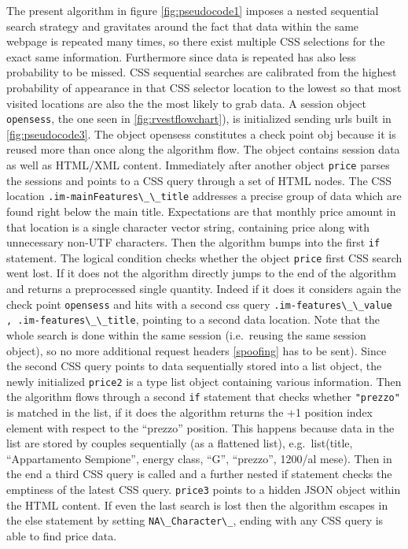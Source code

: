 \documentclass[
  12pt,
  a4paper,
  oneside]{book}
\newcommand{\passthrough}[1]{#1}
\theoremstyle{definition}
\theoremstyle{definition}
\theoremstyle{definition}
\theoremstyle{remark}
\begin{document}
The present algorithm in figure \ref{fig:pseudocode1} imposes a nested sequential search strategy and gravitates around the fact that data within the same webpage is repeated many times, so there exist multiple CSS selections for the exact same information. Furthermore since data is repeated has also less probability to be missed. CSS sequential searches are calibrated from the highest probability of appearance in that CSS selector location to the lowest so that most visited locations are also the the most likely to grab data.
A session object \passthrough{\lstinline!opensess!}, the one seen in \ref{fig:rvestflowchart}), is initialized sending urls built in \ref{fig:pseudocode3}. The object opensess constitutes a check point obj because it is reused more than once along the algorithm flow. The object contains session data as well as HTML/XML content. Immediately after another object \passthrough{\lstinline!price!} parses the sessions and points to a CSS query through a set of HTML nodes. The CSS location \passthrough{\lstinline!.im-mainFeatures\_\_title!} addresses a precise group of data which are found right below the main title. Expectations are that monthly price amount in that location is a single character vector string, containing price along with unnecessary non-UTF characters. Then the algorithm bumps into the first \passthrough{\lstinline!if!} statement. The logical condition checks whether the object \passthrough{\lstinline!price!} first CSS search went lost. If it does not the algorithm directly jumps to the end of the algorithm and returns a preprocessed single quantity. Indeed if it does it considers again the check point \passthrough{\lstinline!opensess!} and hits with a second css query \passthrough{\lstinline!.im-features\_\_value , .im-features\_\_title!}, pointing to a second data location. Note that the whole search is done within the same session (i.e.~reusing the same session object), so no more additional request headers \ref{spoofing} has to be sent). Since the second CSS query points to data sequentially stored into a list object, the newly initialized \passthrough{\lstinline!price2!} is a type list object containing various information. Then the algorithm flows through a second \passthrough{\lstinline!if!} statement that checks whether \passthrough{\lstinline!"prezzo"!} is matched in the list, if it does the algorithm returns the +1 position index element with respect to the ``prezzo'' position. This happens because data in the list are stored by couples sequentially (as a flattened list), e.g.~list(title, ``Appartamento Sempione'', energy class, ``G'', ``prezzo'', 1200/al mese). Then in the end a third CSS query is called and a further nested if statement checks the emptiness of the latest CSS query. \passthrough{\lstinline!price3!} points to a hidden JSON object within the HTML content. If even the last search is lost then the algorithm escapes in the else statement by setting \passthrough{\lstinline!NA\_Character\_!}, ending with any CSS query is able to find price data.
\end{document}
